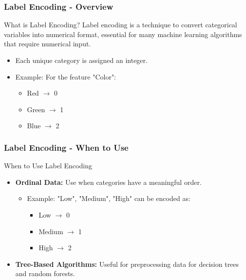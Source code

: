 \documentclass[aspectratio=169]{beamer}
\begin{document}
\begin{frame}[fragile]
    \frametitle{Label Encoding - Overview}
    \begin{block}{What is Label Encoding?}
        Label encoding is a technique to convert categorical variables into numerical format, essential for many machine learning algorithms that require numerical input.
    \end{block}
    \begin{itemize}
        \item Each unique category is assigned an integer.
        \item Example: For the feature "Color":
        \begin{itemize}
            \item Red $\to$ 0
            \item Green $\to$ 1
            \item Blue $\to$ 2
        \end{itemize}
    \end{itemize}
\end{frame}

\begin{frame}[fragile]
    \frametitle{Label Encoding - When to Use}
    \begin{block}{When to Use Label Encoding}
        \begin{itemize}
            \item \textbf{Ordinal Data:} Use when categories have a meaningful order.
            \begin{itemize}
                \item Example: {"Low", "Medium", "High"} can be encoded as:
                \begin{itemize}
                    \item Low $\to$ 0
                    \item Medium $\to$ 1
                    \item High $\to$ 2
                \end{itemize}
            \end{itemize}
            \item \textbf{Tree-Based Algorithms:} Useful for preprocessing data for decision trees and random forests.
        \end{itemize}
    \end{block}
\end{frame}
\end{document}
